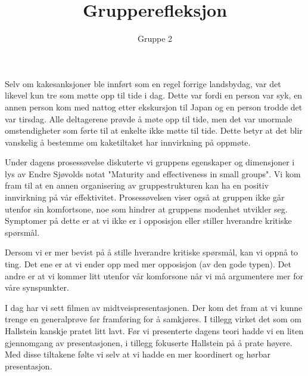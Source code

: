 \documentclass[10pt,a4paper]{article}
\title{Grupperefleksjon}
\author{Gruppe 2}
\begin{document}
\maketitle

Selv om kakesanksjoner ble innført som en regel forrige landsbydag, var det likevel kun tre som møtte opp til tide i dag. Dette var fordi en person var syk, en annen person kom med nattog etter ekskursjon til Japan og en person trodde det var tirsdag. Alle deltagerene prøvde å møte opp til tide, men det var unormale omstendigheter som førte til at enkelte ikke møtte til tide. Dette betyr at det blir vanskelig å bestemme om kaketiltaket har innvirkning på oppmøte.   

Under dagens prosessøvelse diskuterte vi gruppens egenskaper og dimensjoner i lys av Endre Sjøvolds notat "Maturity and effectiveness in small groups". Vi kom fram til at en annen organisering av gruppestrukturen kan ha en positiv innvirkning på vår effektivitet. Prosessøvelsen viser også at gruppen ikke går utenfor sin komfortsone, noe som hindrer at gruppens modenhet utvikler seg. Symptomer på dette er at vi ikke er i opposisjon eller stiller hverandre kritiske spørsmål.

Dersom vi er mer bevist på å stille hverandre kritiske spørsmål, kan vi oppnå to ting. Det ene er at vi ender opp med mer opposisjon (av den gode typen). Det andre er at vi kommer litt utenfor vår komforsone når vi må argumentere mer for våre synspunkter.


I dag har vi sett filmen av midtveispresentasjonen. Der kom det fram at vi kunne trenge en generalprøve før framføring for å samkjøres. I tillegg virket det som om Hallstein kanskje pratet litt lavt. Før vi presenterte dagens teori hadde vi en liten gjennomgang av presentasjonen, i tillegg fokuserte Hallstein på å prate høyere. Med disse tiltakene følte vi selv at vi hadde en mer koordinert og hørbar presentasjon. 
 
\end{document}
